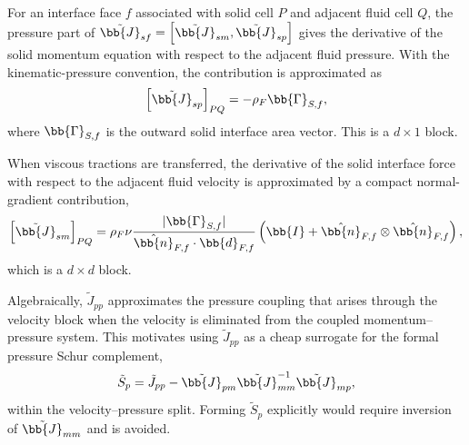 For an interface face $f$ associated with solid cell $P$ and adjacent fluid
cell $Q$, the pressure part of
$\tilde{\bb{J}}_{sf}
=
\left[\tilde{\bb{J}}_{sm},\tilde{\bb{J}}_{sp}\right]$
gives the derivative of the solid momentum equation with respect to the
adjacent fluid pressure. With the kinematic-pressure convention, the
contribution is approximated as
\begin{equation}
    \left[\tilde{\bb{J}}_{sp}\right]_{P Q}
    =
    - \rho_F \bb{\Gamma}_{S,f},
    \label{qm:eqn:pressure_coupling_approximation}
\end{equation}
where $\bb{\Gamma}_{S,f}$ is the outward solid interface area vector. This is a
$d\times 1$ block.

When viscous tractions are transferred, the derivative of the solid interface
force with respect to the adjacent fluid velocity is approximated by a compact
normal-gradient contribution,
\begin{equation}
    \left[\tilde{\bb{J}}_{sm}\right]_{P Q}
    =
    \rho_F \nu
    \frac{|\bb{\Gamma}_{S,f}|}
         {\hat{\bb{n}}_{F,f} \cdot \bb{d}_{F,f}}
    \left(
    \bb{I}
    +
    \hat{\bb{n}}_{F,f} \otimes \hat{\bb{n}}_{F,f}
    \right),
    \label{qm:eqn:viscous_coupling_approximation}
\end{equation}
which is a $d\times d$ block.

Algebraically, $\tilde{J}_{pp}$ approximates the pressure coupling that arises through the velocity block when the velocity is eliminated from the coupled momentum--pressure system. This motivates using $\tilde{J}_{pp}$ as a cheap surrogate for the formal pressure Schur complement,
\begin{equation}
\tilde{S}_p = \tilde{J}_{pp} - \tilde{\bb{J}}_{pm}\tilde{\bb{J}}_{mm}^{-1}\tilde{\bb{J}}_{mp},
\label{qm:eqn:schur_complement}
\end{equation}
within the velocity--pressure split. Forming $\tilde{S}_p$ explicitly would require inversion of $\tilde{\bb{J}}_{mm}$ and is avoided.

